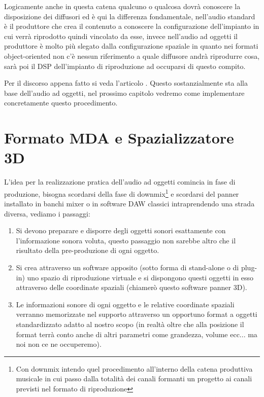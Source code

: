 \documentclass[12pt,a4paper]{report}
\begin{document}
Logicamente anche in questa catena qualcuno o qualcosa dovrà conoscere la disposizione dei diffusori ed è qui la differenza fondamentale, nell'audio standard è il produttore che crea il contenuto a conoscere la configurazione dell'impianto in cui verrà riprodotto quindi vincolato da esse, invece nell'audio ad oggetti il produttore è molto più slegato dalla configurazione spaziale in quanto nei formati object-oriented non c'è nessun riferimento a quale diffusore andrà riprodurre cosa, sarà poi il DSP dell'impianto di riproduzione ad occuparsi di questo compito.

Per il discorso appena fatto si veda l'articolo \cite{object}.
Questo sostanzialmente sta alla base dell'audio ad oggetti, nel prossimo capitolo vedremo come implementare concretamente questo procedimento.

\chapter{Formato MDA e Spazializzatore 3D} \label{dolby}

L'idea per la realizzazione pratica dell'audio ad oggetti comincia in fase di produzione, bisogna scordarsi della fase di downmix\footnote{Con downmix intendo quel procedimento all'interno della catena produttiva musicale in cui passo dalla totalità dei canali formanti un progetto ai canali previsti nel formato di riproduzione} e scordarsi del panner installato in banchi mixer o in software DAW classici intraprendendo una strada diversa, vediamo i passaggi:

 \begin{enumerate}
 
\item Si devono preparare e disporre degli oggetti sonori esattamente con l'informazione sonora voluta, questo passaggio non sarebbe altro che il risultato della pre-produzione di ogni oggetto.
\item Si crea attraverso un software apposito (sotto forma di stand-alone o di plug-in) uno spazio di riproduzione virtuale e si dispongono questi oggetti in esso attraverso delle coordinate spaziali (chiamerò questo software panner 3D).
\item Le informazioni sonore di ogni oggetto e le relative coordinate spaziali verranno memorizzate nel supporto attraverso un opportuno format a oggetti standardizzato adatto al nostro scopo (in realtà oltre che alla posizione il format terrà conto anche di altri parametri come grandezza, volume ecc... ma noi non ce ne occuperemo).
 \end{enumerate}
\end{document}
